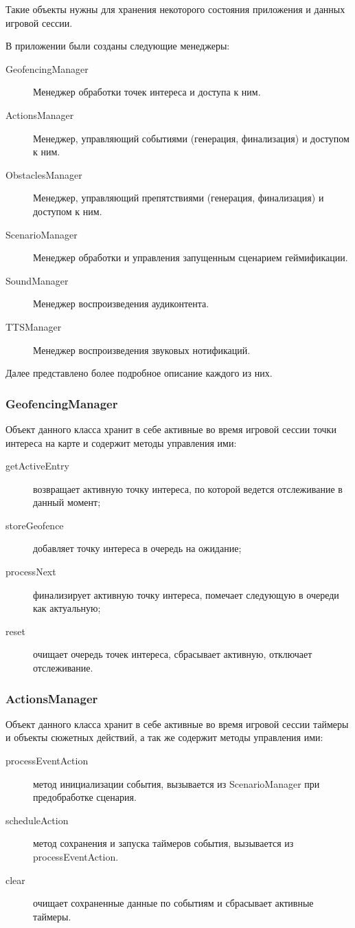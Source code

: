 Такие объекты нужны для хранения некоторого состояния приложения и данных игровой сессии.

В приложении были созданы следующие менеджеры:
\begin{description}
	\item[GeofencingManager] Менеджер обработки точек интереса и доступа к ним.
	\item[ActionsManager] Менеджер, управляющий событиями (генерация, финализация) и доступом к ним.
	\item[ObstaclesManager] Менеджер, управляющий препятствиями (генерация, финализация) и доступом к ним.
	\item[ScenarioManager] Менеджер обработки и управления запущенным сценарием геймификации.
	\item[SoundManager] Менеджер воспроизведения аудиконтента.
	\item[TTSManager] Менеджер воспроизведения звуковых нотификаций.
\end{description}
\smallskip
Далее представлено более подробное описание каждого из них.

\subsubsection*{GeofencingManager}
\label{subsubsec:geofencing_manager}
Объект данного класса хранит в себе активные во время игровой сессии точки интереса на карте и содержит методы управления ими:
\begin{description}
	\item[getActiveEntry] возвращает активную точку интереса, по которой ведется отслеживание в данный момент;
	\item[storeGeofence] добавляет точку интереса в очередь на ожидание;
	\item[processNext] финализирует активную точку интереса, помечает следующую в очереди как актуальную;
	\item[reset] очищает очередь точек интереса, сбрасывает активную, отключает отслеживание.
\end{description}

\subsubsection*{ActionsManager}
Объект данного класса хранит в себе активные во время игровой сессии таймеры и объекты сюжетных действий, а так же содержит методы управления ими:
\begin{description}
	\item[processEventAction] метод инициализации события, вызывается из ScenarioManager при предобработке сценария. 
	\item[scheduleAction] метод сохранения и запуска таймеров события, вызывается из processEventAction.
	\item[clear] очищает сохраненные данные по событиям и сбрасывает активные таймеры.
\end{description}

